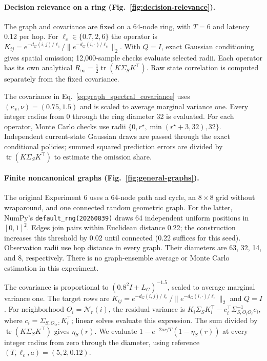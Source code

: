 \paragraph{Decision relevance on a ring (Fig.~\ref{fig:decision-relevance}).}
The graph and covariance are fixed on a 64-node ring, with $T=6$ and latency
0.12 per hop. For $\ell_c\in\{0.7,2,6\}$ the operator is
$K_{ij}=e^{-d_G(i,j)/\ell_c}/\|e^{-d_G(i,\cdot)/\ell_c}\|_2$.
With $Q=I$, exact Gaussian conditioning gives spatial omission; 12,000-sample
checks evaluate selected radii. Each operator has its own analytical
$R_\infty=\tfrac12\operatorname{tr}(K\Sigma_S K^\top)$.
Raw state correlation is computed separately from the fixed covariance.

The covariance in Eq.~\eqref{eq:graph_spectral_covariance} uses
$(\kappa_s,\nu)=(0.75,1.5)$ and is scaled to average marginal variance one.
Every integer radius from 0 through the ring diameter 32 is evaluated.
For each operator, Monte Carlo checks use radii
$\{0,r^\star,\min(r^\star+3,32),32\}$. Independent current-state Gaussian
draws are passed through the exact conditional policies; summed squared
prediction errors are divided by $\operatorname{tr}(K\Sigma_SK^\top)$
to estimate the omission share.

\paragraph{Finite noncanonical graphs (Fig.~\ref{fig:general-graphs}).}
The original Experiment 6 uses a 64-node path and cycle, an $8\times8$
grid without wraparound, and one connected random geometric graph.
For the latter, NumPy's \texttt{default\_rng(20260839)} draws 64 independent
uniform positions in $[0,1]^2$. Edges join pairs within Euclidean distance
0.22; the construction increases this threshold by 0.02 until connected
(0.22 suffices for this seed). Observation radii use hop distance in every
graph. Their diameters are 63, 32, 14, and 8, respectively.
There is no graph-ensemble average or Monte Carlo estimation in this experiment.

The covariance is proportional to $(0.8^2I+L_G)^{-1.5}$, scaled to average
marginal variance one. The target rows are
$K_{ij}=e^{-d_G(i,j)/\ell_c}/\|e^{-d_G(i,\cdot)/\ell_c}\|_2$ and $Q=I$.
For neighborhood $O_i=\mathcal N_r(i)$, the residual variance is
$K_i\Sigma_S K_i^\top-c_i^\top\Sigma_{S,O_iO_i}^{-1}c_i$,
where $c_i=\Sigma_{S,O_i,:}K_i^\top$; linear solves evaluate this expression.
The sum divided by $\operatorname{tr}(K\Sigma_S K^\top)$ gives $\eta_S(r)$.
We evaluate $1-e^{-2ar/T}(1-\eta_S(r))$ at every integer radius from zero
through the diameter, using reference $(T,\ell_c,a)=(5,2,0.12)$.

